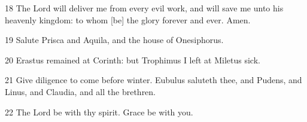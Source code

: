 \par 18 The Lord will deliver me from every evil work, and will save me unto his heavenly kingdom: to whom [be] the glory forever and ever. Amen.
\par 19 Salute Prisca and Aquila, and the house of Onesiphorus.
\par 20 Erastus remained at Corinth: but Trophimus I left at Miletus sick.
\par 21 Give diligence to come before winter. Eubulus saluteth thee, and Pudens, and Linus, and Claudia, and all the brethren.
\par 22 The Lord be with thy spirit. Grace be with you.


